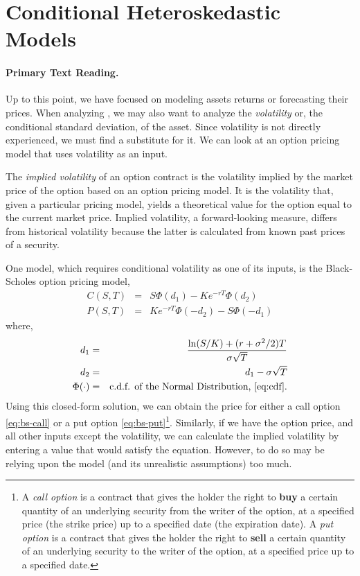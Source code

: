 \section{Conditional Heteroskedastic Models}\label{Conditional Heteroskedastic}
\paragraph{Primary Text Reading.} 

Up to this point, we have focused on modeling assets returns or forecasting their prices. When analyzing \fts{}, we may also want to analyze the \emph{volatility} or, the conditional standard deviation, of the asset. Since volatility is not directly experienced, we must find a substitute for it. We can look at an option pricing model that uses volatility as an input.

The \emph{implied volatility} of an option contract is the volatility implied by the market price of the option based on an option pricing model. It is the volatility that, given a particular pricing model, yields a theoretical value for the option equal to the current market price. Implied volatility, a forward-looking measure, differs from historical volatility because the latter is calculated from known past prices of a security.

One model, which requires conditional volatility as one of its inputs, is the Black-Scholes option pricing model,
\begin{subequations}
	\begin{eqnarray}
	C(S,T) &=& S\Phi(d_1) - Ke^{-rT}\Phi(d_2) \label{eq:bs-call} \\
	P(S,T) &=& Ke^{-rT}\Phi(-d_2) - S\Phi(-d_1) \label{eq:bs-put}
	\end{eqnarray}
\end{subequations}
where,
\begin{eqnarray*}
d_1 &=& \frac{\ln(S/K) + (r + \sigma^2/2)T}{\sigma\sqrt{T}} \notag \\
d_2 &=& d_1 - \sigma\sqrt{T} \notag \\
\Phi(\cdot) &=& \text{c.d.f. of the Normal Distribution, \eqref{eq:cdf}}. \notag
\end{eqnarray*}
Using this closed-form solution, we can obtain the price for either a call option \eqref{eq:bs-call} or a put option \eqref{eq:bs-put}\footnote{A \emph{call option} is a contract that gives the holder the right to \textbf{buy} a certain quantity of an underlying security from the writer of the option, at a specified price (the strike price) up to a specified date (the expiration date). 
A \emph{put option} is a contract that gives the holder the right to \textbf{sell} a certain quantity of an underlying security to the writer of the option, at a specified price up to a specified date.
}.
Similarly, if we have the option price, and all other inputs except the volatility, we can calculate the implied volatility by entering a value that would satisfy the equation. However, to do so may be relying upon the model (and its unrealistic assumptions) too much.

